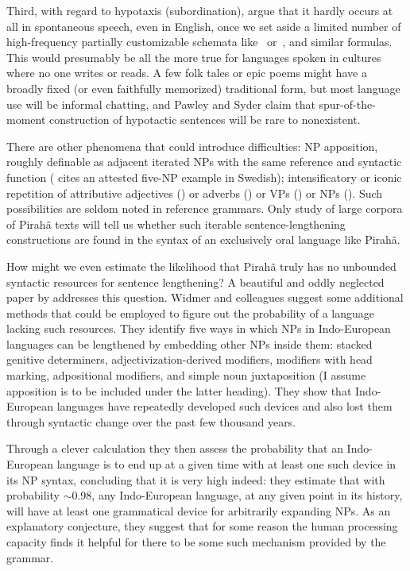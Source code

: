 \documentclass[output=paper,colorlinks,citecolor=brown
]{langscibook}
\begin{document}
Third, with regard to hypotaxis (subordination), \citet{PawlSyde00}
argue that it hardly occurs at all in spontaneous speech, even in
English, once we set aside a limited number of high-frequency partially
customizable schemata like \, or \,, and similar formulas. This would presumably be all
the more true for languages spoken in cultures where no one writes
or reads. A few folk tales or epic poems might have a broadly fixed
(or even faithfully memorized) traditional form, but most language
use will be informal chatting, and Pawley and Syder claim that
spur-of-the-moment construction of hypotactic sentences will be rare
to nonexistent.

There are other phenomena that could introduce difficulties: NP
apposition, roughly definable as adjacent iterated NPs with the same
reference and syntactic function (\citealt{Karlsson10} cites an
attested five-NP example in Swedish); intensificatory or iconic
repetition of attributive adjectives ()
or adverbs () or VPs () or NPs (). Such possibilities are seldom noted
in reference grammars. Only study of large corpora of Pirahã
texts will tell us whether such iterable sentence-lengthening
constructions are found in the syntax of an exclusively oral language
like Pirahã.

\begin{sloppypar}
How might we even estimate the likelihood that Pirahã truly has no
unbounded syntactic resources for sentence lengthening? A beautiful
and oddly neglected paper by \citet{WidmerEtAl17} addresses this
question. Widmer and colleagues suggest some additional methods that
could be employed to figure out the probability of a language lacking
such resources. They identify five ways in which NPs in Indo-European
languages can be lengthened by embedding other NPs inside them: stacked
genitive determiners, adjectivization-derived modifiers, modifiers
with head marking, adpositional modifiers, and simple noun
juxtaposition (I assume apposition is to be included under the latter
heading). They show that Indo-European languages have repeatedly
developed such devices and also lost them through syntactic change
over the past few thousand years.
\end{sloppypar}

Through a clever calculation they then assess the probability that an Indo-European
language is to end up at a given time with at least one such device in
its NP syntax, concluding that it is very high indeed: they estimate
that with probability $\sim$0.98, any Indo-European language, at any
given point in its history, will have at least one grammatical device
for arbitrarily expanding NPs. As an explanatory conjecture, they suggest
that for some reason the human processing capacity finds it helpful for
there to be some such mechanism provided by the grammar.
\end{document}
